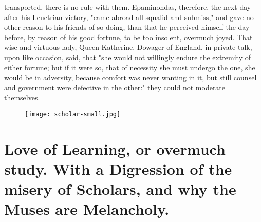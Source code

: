 transported, there is no rule with them. Epaminondas, therefore, the next day
after his Leuctrian victory, "came abroad all squalid and
submiss," and gave no other reason to his friends of so doing, than that he
perceived himself the day before, by reason of his good fortune, to be too
insolent, overmuch joyed. That wise and virtuous lady,
Queen Katherine, Dowager of England, in private talk, upon
like occasion, said, that "she would not willingly endure
the extremity of either fortune; but if it were so, that of necessity she must
undergo the one, she would be in adversity, because comfort was never wanting
in it, but still counsel and government were defective in the other:" they
could not moderate themselves.

\cleartoleftpage{}
\begin{figure}[p]
  \begingroup
  \centering
  \texttt{[image: scholar-small.jpg]}
  \label{fig:scholar}
\end{figure}

\clearpage{}
\thispagestyle{titleontop}

\section[Love of Learning, or overmuch study.]{Love of Learning, or overmuch
study. With a Digression of the misery of Scholars, and why the Muses are
Melancholy.}

